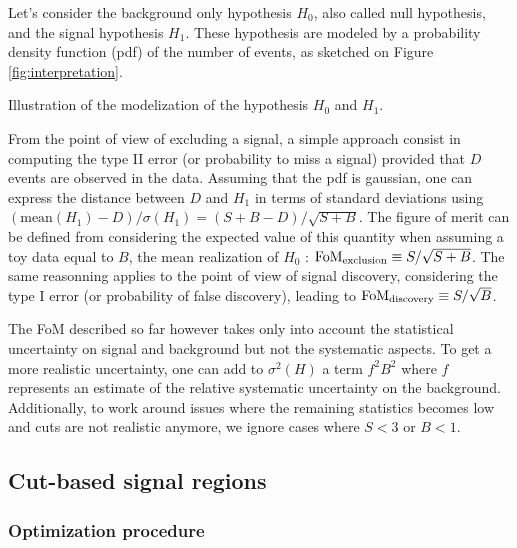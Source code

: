             Let's consider the background only hypothesis $H_0$, also called null hypothesis, and the 
            signal hypothesis $H_1$. These hypothesis are modeled by a probability density function (pdf) of 
            the number of events, as sketched on Figure \ref{fig:interpretation}.
           
                         {Illustration of the modelization of the hypothesis $H_0$ and $H_1$.}

            From the point of view of excluding a signal, a simple approach consist in computing the type 
            II error (or probability to miss a signal) provided that $D$ events are observed in the
            data. Assuming that the pdf is gaussian, one can express the distance between $D$ and $H_1$ in terms 
            of standard deviations using $(\text{mean}(H_1) - D) / \sigma(H_1) = (S + B - D) / \sqrt{S+B}$.
            The figure of merit can be defined from considering the expected value of this quantity when assuming 
            a toy data equal to $B$, the mean realization of $H_0$ : $\text{FoM}_\text{exclusion} \equiv S 
            / \sqrt{S+B}$. The same reasonning applies to the point of view of signal discovery, considering 
            the type I error (or probability of false discovery), leading to $\text{FoM}_\text{discovery}
            \equiv S/\sqrt{B}$.

            The FoM described so far however takes only into account the statistical uncertainty on signal and 
            background but not the systematic aspects. To get a more realistic uncertainty, one can add to 
            $\sigma^2(H)$ a term $f^2 B^2$ where $f$ represents an estimate of the relative systematic uncertainty 
            on the background. Additionally, to work around issues where the remaining statistics becomes low and 
            cuts are not realistic anymore, we ignore cases where $S < 3$ or $B < 1$.

        \subsection{Cut-based signal regions}

            \subsubsection{Optimization procedure}

